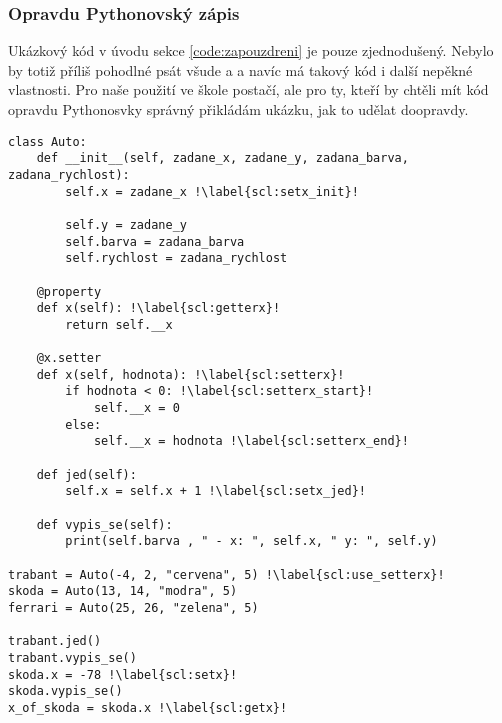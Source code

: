 \subsubsection{Opravdu Pythonovský zápis}
Ukázkový kód v úvodu sekce \ref{code:zapouzdreni} je pouze zjednodušený. Nebylo by totiž příliš pohodlné psát všude  a  a navíc má takový kód i další nepěkné vlastnosti. Pro naše použití ve škole postačí, ale pro ty, kteří by chtěli mít kód opravdu Pythonosvky správný přikládám ukázku, jak to udělat doopravdy.\\
\begin{minipage}[t]{.45\textwidth}
\begin{code}
\begin{verbatim}
class Auto:
	def __init__(self, zadane_x, zadane_y, zadana_barva, zadana_rychlost):
		self.x = zadane_x !\label{scl:setx_init}!
		
		self.y = zadane_y
		self.barva = zadana_barva
		self.rychlost = zadana_rychlost

	@property		
	def x(self): !\label{scl:getterx}!
		return self.__x	
	
	@x.setter
	def x(self, hodnota): !\label{scl:setterx}!
		if hodnota < 0: !\label{scl:setterx_start}!
			self.__x = 0
		else:
			self.__x = hodnota !\label{scl:setterx_end}!
	
	def jed(self):
		self.x = self.x + 1 !\label{scl:setx_jed}!
		
	def vypis_se(self):
		print(self.barva , " - x: ", self.x, " y: ", self.y)
		
trabant = Auto(-4, 2, "cervena", 5) !\label{scl:use_setterx}!
skoda = Auto(13, 14, "modra", 5)
ferrari = Auto(25, 26, "zelena", 5)

trabant.jed()
trabant.vypis_se()
skoda.x = -78 !\label{scl:setx}!
skoda.vypis_se()
x_of_skoda = skoda.x !\label{scl:getx}!
\end{verbatim}

\label{code:zapouzdreni_pythonovsky}
\end{code}
\end{minipage}
